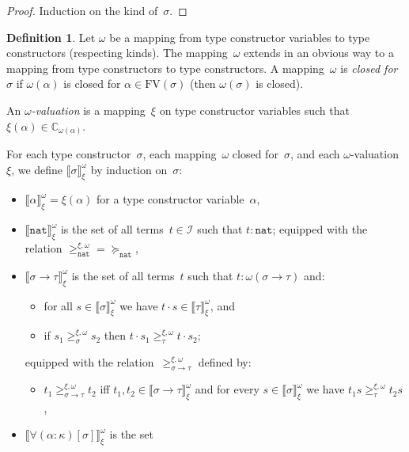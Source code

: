 \documentclass[a4paper,UKenglish,cleveref,autoref,numberwithinsect]{lipics-v2019}
\theoremstyle{definition}
\newtheorem{defn}[theorem]{Definition}
\newcommand{\Iterms}{\mathcal{I}}
\newcommand{\arrtype}{\rightarrow}
\newcommand{\app}[2]{#1 \cdot #2}
\newcommand{\nat}{\mathtt{nat}}
\newcommand{\FV}{\mathrm{FV}}
\newcommand{\Cb}{\mathbb{C}}
\newcommand{\val}[3]{\ensuremath{\llbracket#1\rrbracket_{#2}^{#3}}}
\newcommand{\gteq}[3]{\ensuremath{\ge_{#1}^{#2,#3}}}
\begin{document}
\begin{proof}
  Induction on the kind of~$\sigma$.
\end{proof}

\begin{defn}\label{def_wm_valuation}
  Let $\omega$ be a mapping from type constructor variables to type
  constructors (respecting kinds). The mapping~$\omega$ extends in an
  obvious way to a mapping from type constructors to type
  constructors. A mapping~$\omega$ is \emph{closed for~$\sigma$} if
  $\omega(\alpha)$ is closed for $\alpha \in \FV(\sigma)$ (then
  $\omega(\sigma)$ is closed).

  An \emph{$\omega$-valuation} is a mapping~$\xi$ on type constructor
  variables such that $\xi(\alpha) \in \Cb_{\omega(\alpha)}$.

  For each type constructor~$\sigma$, each mapping~$\omega$ closed
  for~$\sigma$, and each $\omega$-valuation~$\xi$, we define
  $\val{\sigma}{\xi}{\omega}$ by induction on~$\sigma$:
  \begin{itemize}
  \item $\val{\alpha}{\xi}{\omega} = \xi(\alpha)$ for a type
    constructor variable~$\alpha$,
  \item $\val{\nat}{\xi}{\omega}$ is the set of all terms~$t \in
    \Iterms$ such that $t : \nat$; equipped with the relation
    $\gteq{\nat}{\xi}{\omega} = \succeq_\nat$,
  \item $\val{\sigma \arrtype \tau}{\xi}{\omega}$ is the set of all
    terms~$t$ such that $t : \omega(\sigma\arrtype\tau)$ and:
    \begin{itemize}
    \item for all $s \in \val{\sigma}{\xi}{\omega}$ we have
      $\app{t}{s} \in \val{\tau}{\xi}{\omega}$, and
    \item if $s_1 \gteq{\sigma}{\xi}{\omega} s_2$ then $\app{t}{s_1}
      \gteq{\tau}{\xi}{\omega} \app{t}{s_2}$;
    \end{itemize}
    equipped with the
    relation~$\gteq{\sigma\arrtype\tau}{\xi}{\omega}$ defined by:
    \begin{itemize}
    \item $t_1 \gteq{\sigma\arrtype\tau}{\xi}{\omega} t_2$ iff
      $t_1,t_2 \in \val{\sigma\arrtype\tau}{\xi}{\omega}$ and for
      every $s \in \val{\sigma}{\xi}{\omega}$ we have $t_1 s
      \gteq{\tau}{\xi}{\omega} t_2 s$,
    \end{itemize}
  \item $\val{\forall(\alpha:\kappa)[\sigma]}{\xi}{\omega}$ is the set

\end{itemize}
\end{defn}
\end{document}
